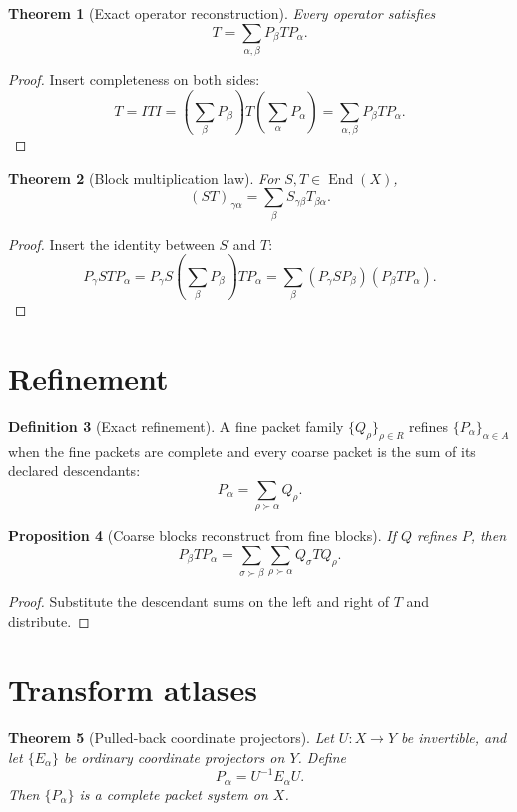 \documentclass[11pt,oneside]{book}
\newtheorem{theorem}{Theorem}[chapter]
\newtheorem{proposition}[theorem]{Proposition}
\theoremstyle{definition}
\newtheorem{definition}[theorem]{Definition}
\theoremstyle{remark}
\newcommand{\Id}{I}
\begin{document}
\begin{theorem}[Exact operator reconstruction]\label{thm:operator-reconstruction}
Every operator satisfies
\[
\boxed{T=\sum_{\alpha,\beta}P_\beta T P_\alpha.}
\]
\end{theorem}

\begin{proof}
Insert completeness on both sides:
\[
T=\Id T\Id
=\left(\sum_\beta P_\beta\right)T\left(\sum_\alpha P_\alpha\right)
=\sum_{\alpha,\beta}P_\beta TP_\alpha.
\]
\end{proof}

\begin{theorem}[Block multiplication law]\label{thm:block-product}
For $S,T\in\operatorname{End}(X)$,
\[
\boxed{(ST)_{\gamma\alpha}=\sum_\beta S_{\gamma\beta}T_{\beta\alpha}.}
\]
\end{theorem}

\begin{proof}
Insert the identity between $S$ and $T$:
\[
P_\gamma STP_\alpha
=P_\gamma S\left(\sum_\beta P_\beta\right)TP_\alpha
=\sum_\beta(P_\gamma SP_\beta)(P_\beta TP_\alpha).
\]
\end{proof}

\section{Refinement}
\begin{definition}[Exact refinement]
A fine packet family $\{Q_\rho\}_{\rho\in R}$ refines $\{P_\alpha\}_{\alpha\in A}$ when the fine packets are complete and every coarse packet is the sum of its declared descendants:
\[
P_\alpha=\sum_{\rho\succ\alpha}Q_\rho.
\]
\end{definition}

\begin{proposition}[Coarse blocks reconstruct from fine blocks]\label{prop:block-refinement}
If $Q$ refines $P$, then
\[
\boxed{
P_\beta TP_\alpha
=\sum_{\sigma\succ\beta}\sum_{\rho\succ\alpha}Q_\sigma TQ_\rho.
}
\]
\end{proposition}

\begin{proof}
Substitute the descendant sums on the left and right of $T$ and distribute.
\end{proof}

\section{Transform atlases}
\begin{theorem}[Pulled-back coordinate projectors]\label{thm:transform-atlas}
Let $U:X\to Y$ be invertible, and let $\{E_\alpha\}$ be ordinary coordinate projectors on $Y$. Define
\[
P_\alpha=U^{-1}E_\alpha U.
\]
Then $\{P_\alpha\}$ is a complete packet system on $X$.
\end{theorem}
\end{document}
